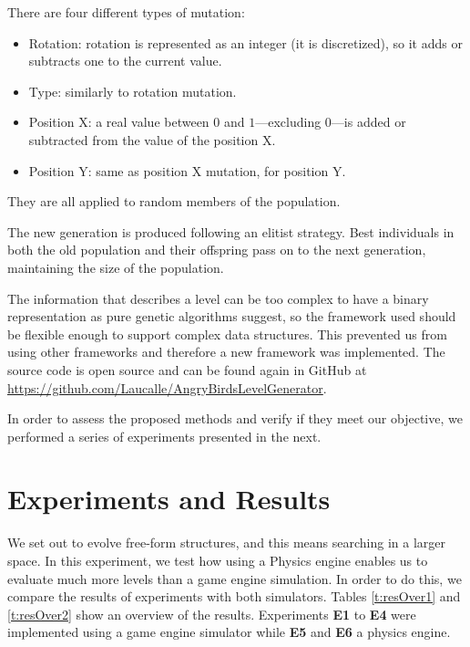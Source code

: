 \documentclass[a4paper,twoside]{article}
\begin{document}
There are four different types of mutation:

\begin{itemize}
	\item Rotation: rotation is represented as an integer (it is discretized), 
	so it adds or 
	subtracts one 
	to the current value. %
	\item Type: similarly to rotation mutation.
	\item Position X: a real value between $0$ and $1$---excluding $0$---is 
	added or subtracted from the value of the position X.
	\item Position Y: same as position X mutation, for position Y.
\end{itemize}

They are all applied to random members of the population.

The new generation is produced following an elitist strategy. Best individuals in 
both the old population and their offspring pass on to the next generation, 
maintaining the size of the population.

The information that describes a level can be too complex to have a binary 
representation as pure genetic algorithms suggest, so the framework used should be 
flexible enough to support complex data structures. This prevented us from using other 
frameworks and therefore a new framework was implemented. The source code is open source and can be found again in GitHub at \url{https://github.com/Laucalle/AngryBirdsLevelGenerator}. %

In order to assess the proposed methods and verify if they meet our
objective, we performed a series of experiments presented in the next.

\section{Experiments and Results}\label{ch:res}

We set out to evolve free-form structures, and this means searching in a larger space. In this experiment, we test how using a Physics engine enables us to evaluate much more levels than a game engine simulation. In order to do this, we compare the results of experiments with both simulators. Tables \ref{t:resOver1} and \ref{t:resOver2} 
show an overview of the results. Experiments \textbf{E1} to \textbf{E4} were implemented 
using a game engine simulator while \textbf{E5} and \textbf{E6} a physics engine.
\end{document}
